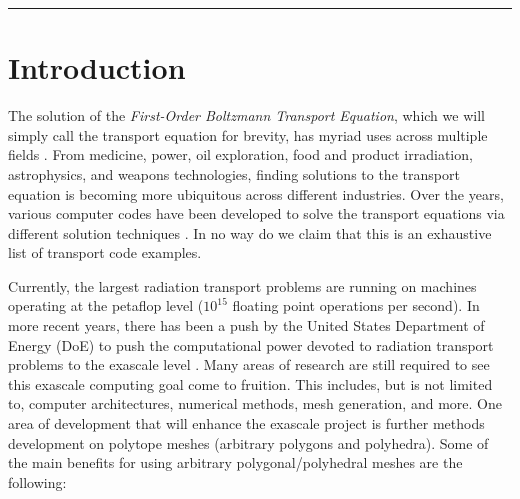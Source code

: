 \documentclass[11pt]{article}
\begin{document}
\noindent\rule{6.25in}{0.4pt}

\section{Introduction}
\label{sec::intro}

The solution of the {\em First-Order Boltzmann Transport Equation}, which we will simply call the transport equation for brevity, has myriad uses across multiple fields \cite{duderstadt1979transport,duderstadt1976nuclear}. From medicine, power, oil exploration, food and product irradiation, astrophysics, and weapons technologies, finding solutions to the transport equation is becoming more ubiquitous across different industries. Over the years, various computer codes have been developed to solve the transport equations via different solution techniques \cite{hill1975onetran,reed1973triplet,seed1978trident,mordant1981some,ref::geant4,ref::MCNP,ref::DANTSYS,ref::TORT,ref::PENTRAN,ref::TRITON,ref::NEWT}. In no way do we claim that this is an exhaustive list of transport code examples.

Currently, the largest radiation transport problems are running on machines operating at the petaflop level ($10^{15}$ floating point operations per second). In more recent years, there has been a push by the United States Department of Energy (DoE) to push the computational power devoted to radiation transport problems to the exascale level \cite{bergman2008exascale}. Many areas of research are still required to see this exascale computing goal come to fruition. This includes, but is not limited to, computer architectures, numerical methods, mesh generation, and more. One area of development that will enhance the exascale project is further methods development on polytope meshes (arbitrary polygons and polyhedra). Some of the main benefits for using arbitrary polygonal/polyhedral meshes are the following:
\end{document}
